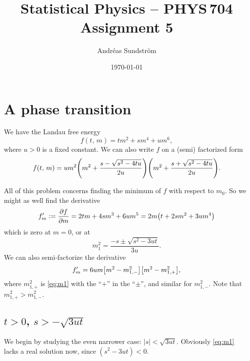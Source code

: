 \documentclass[11pt,letter, swedish, english
]{article}
\begin{document}




\title{Statistical Physics -- PHYS\,704 \\
Assignment 5}
\author{Andréas Sundström}
\date{\today}

\maketitle


\section{A phase transition}

We have the Landau free energy
\begin{equation}\label{eq:f}
f(t,\,m)=%
tm^2+sm^4+um^6,
\end{equation}
where $u>0$ is a fixed constant.
We can also write $f$ on a (semi) factorized form
\begin{equation}\label{eq:f_fact}
f(t,\,m)=um^2
\qty(m^2+\frac{s-\sqrt{s^2-4tu}}{2u})
\qty(m^2+\frac{s+\sqrt{s^2-4tu}}{2u}).
\end{equation}


All of this problem concerns finding the minimum of $f$ with respect
to $m_0$. So we might as well find the derivative
\begin{equation}
f'_m:=\pdv{f}{m}=2tm+4sm^3+6um^5=2m\qty(t+2sm^2+3um^4)
\end{equation}
which is zero at $m=0$, or at 
\begin{equation}\label{eq:m1}
m_1^2=\frac{-s\pm\sqrt{s^2-3ut}}{3u}.
\end{equation}
We can also semi-factorize the derivative
\begin{equation}\label{eq:f'_fact}
f'_m=6um\qty[m^2-m_{1,-}^2]\qty[m^2-m_{1,+}^2],
\end{equation}
where $m_{1,+}^2$ is \eqref{eq:m1} with the ``+'' in the ``$\pm$'', and
similar for $m_{1, -}^2$. Note that $m_{1,+}^2>m_{1,-}^2$.

\subsection{$t>0$, $s>-\sqrt{3ut}$}
We begin by studying the even narrower case:
$|s|<\sqrt{3ut}$. Obviously \eqref{eq:m1} lacks a real solution now,
since $(s^2-3ut)<0$.
\end{document}
